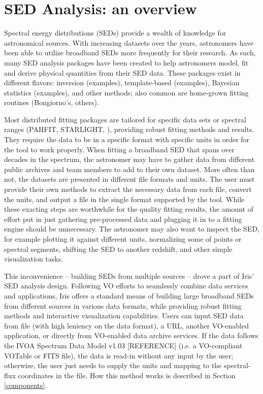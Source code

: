 \label{everyday_seds}
\section{SED Analysis: an overview}

Spectral energy distributions (SEDs) provide a wealth of knowledge for astronomical sources. With increasing datasets over the years, astronomers have been able to utilize broadband SEDs more frequently for their research. As such, many SED analysis packages have been created to help astronomers model, fit and derive physical quantities from their SED data. These packages exist in different flavors: inversion (examples), template-based (examples), Bayesian statistics (examples), and other methods; also common are home-grown fitting routines (Bongiorno's, others). 

Most distributed fitting packages are tailored for specific data sets or spectral ranges (PAHFIT, STARLIGHT, ), providing robust fitting methods and results. They require the data to be in a specific format with specific units in order for the tool to work properly. When fitting a broadband SED that spans over decades in the spectrum, the astronomer may have to gather data from different public archives and team members to add to their own dataset. More often than not, the datasets are presented in different file formats and units. The user must provide their own methods to extract the necessary data from each file, convert the units, and output a file in the single format supported by the tool. While these exacting steps are worthwhile for the quality fitting results, the amount of effort put in just gathering pre-processed data and plugging it in to a fitting engine should be unnecessary. The astronomer may also want to inspect the SED, for example plotting it against different units, normalizing some of points or spectral segments, shifting the SED to another redshift, and other simple visualization tasks.

This inconvenience -- building SEDs from multiple sources -- drove a part of Iris' SED analysis design. Following VO efforts to seamlessly combine data services and applications, Iris offers a standard means of building large broadband SEDs from different sources in various data formats, while providing robust fitting methods and interactive visualization capabilities. Users can input SED data from file (with high leniency on the data format), a URL, another VO-enabled application, or directly from VO-enabled data archive services. If the data follows the IVOA Spectrum Data Model v1.03 [REFERENCE] (i.e. a VO-compliant VOTable or FITS file), the data is read-in without any input by the user; otherwise, the user just needs to supply the units and  mapping to the spectral-flux coordinates in the file. How this method works is described in Section \ref{components}. 

